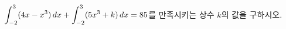 $\displaystyle\int_{-2}^{3} (4x-x^3)\mkern3mu dx+\int_{-2}^{3} (5x^3+k)\mkern3mu dx=85$를 만족시키는 상수 $k$의 값을 구하시오.
